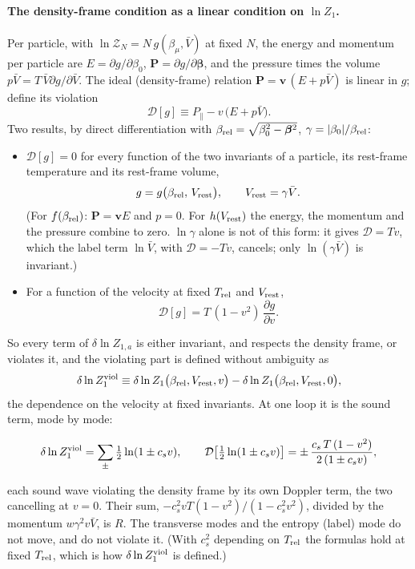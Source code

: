 \documentclass[11pt,aps,preprint,nofootinbib,superscriptaddress,tightenlines]{revtex4-2}
\def\st{\begin{equation}}
\def\stp{\end{equation}}
\let\oldparagraph\paragraph
\renewcommand{\paragraph}{\par\bigskip\oldparagraph}
\begin{document}
\paragraph{The density-frame condition as a linear condition on $\ln Z_1$.}  Per particle, with $\ln\mathcal Z_N=N\,g(\beta_\mu,\bar V)$ at fixed $N$, the energy and
momentum per particle are $E=\partial g/\partial\beta_0$, $\bm P=\partial g/\partial\bm\beta$, and the pressure times the volume $p\bar V=T\,\bar V\partial g/\partial\bar V$.
The ideal (density-frame) relation $\bm P=\bm v\,(E+p\bar V)$ is linear in $g$; define its violation
\st
\mathcal D[g]\equiv P_\parallel-v\,\big(E+p\bar V\big) .
\stp
Two results, by direct differentiation with $\beta_{\rm rel}=\sqrt{\beta_0^2-\bm\beta^2}$, $\gamma=|\beta_0|/\beta_{\rm rel}$:
\begin{itemize}
\item $\mathcal D[g]=0$ for every function of the two invariants of a particle, its rest-frame temperature and its rest-frame volume,
  \st
  g=g\big(\beta_{\rm rel},\,V_{\rm rest}\big),\qquad V_{\rm rest}=\gamma\bar V .
  \stp
  (For $f(\beta_{\rm rel})$: $\bm P=\bm vE$ and $p=0$.  For $h(V_{\rm rest})$ the energy, the momentum and the pressure combine to zero.  $\ln\gamma$ alone is not of this form:
  it gives $\mathcal D=Tv$, which the label term $\ln\bar V$, with $\mathcal D=-Tv$, cancels; only $\ln(\gamma\bar V)$ is invariant.)
\item For a function of the velocity at fixed $T_{\rm rel}$ and $V_{\rm rest}$,
  \st
  \mathcal D[g]=T\,(1-v^2)\,\frac{\partial g}{\partial v} .
  \stp
\end{itemize}
So every term of $\delta\ln Z_{1,a}$ is either invariant, and respects the density frame, or violates it, and the violating part is defined without ambiguity as
\st
\delta\ln Z_1^{\rm viol}\equiv \delta\ln Z_1\big(\beta_{\rm rel},V_{\rm rest},v\big)-\delta\ln Z_1\big(\beta_{\rm rel},V_{\rm rest},0\big) ,
\stp
the dependence on the velocity at fixed invariants.  At one loop it is the sound term, mode by mode:
\begin{keyeq}
\st
\delta\ln Z_1^{\rm viol}=\sum_{\pm}\tfrac12\ln(1\pm c_sv),\qquad \mathcal D\big[\tfrac12\ln(1\pm c_sv)\big]=\pm\,\frac{c_s\,T\,(1-v^2)}{2\,(1\pm c_sv)} ,
\label{Dviol}
\stp
\end{keyeq}
each sound wave violating the density frame by its own Doppler term, the two cancelling at $v=0$.  Their sum, $-c_s^2vT(1-v^2)/(1-c_s^2v^2)$, divided by the momentum
$w\gamma^2v\bar V$, is $R$.  The transverse modes and the entropy (label) mode do not move, and do not violate it.  (With $c_s^2$ depending on $T_{\rm rel}$ the formulas hold
at fixed $T_{\rm rel}$, which is how $\delta\ln Z_1^{\rm viol}$ is defined.)
\end{document}
